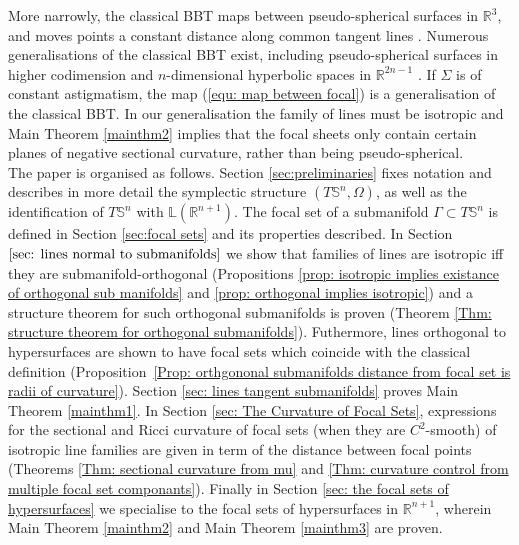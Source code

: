 \documentclass[12pt]{amsart}
\theoremstyle{plain}
\theoremstyle{definition}
\def\R{\mathbb{R}}
\def\S{\mathbb{S}}
\numberwithin{equation}{section}
\begin{document}
More narrowly, the classical BBT maps between pseudo-spherical surfaces in $\R^{3}$, and moves points a constant distance along common tangent lines \cite{RaS82}. Numerous generalisations of the classical BBT exist, including pseudo-spherical surfaces in higher codimension \cite{Gorkavvy2012}\cite{Gorkavvy2015} and $n$-dimensional hyperbolic spaces in ${\mathbb R}^{2n-1}$ \cite{Aminov1978} \cite{Aminov2011} \cite{TaT79} \cite{Terng1980}.
If $\Sigma$ is of constant astigmatism, the map (\ref{equ: map between focal}) is a generalisation of the classical BBT. In our generalisation the family of lines must be isotropic and Main Theorem \ref{mainthm2} implies that the focal sheets only contain certain planes of negative sectional curvature, rather than being pseudo-spherical.\\ 

The paper is organised as follows. Section \ref{sec:preliminaries} fixes notation and describes in more detail the symplectic structure $(T\S^n,\Omega)$, as well as the identification of $T\S^n$ with $\mathbb{L}(\R^{n+1})$. The focal set of a submanifold $\Gamma\subset T\S^n$ is defined in Section \ref{sec:focal sets} and its properties described. In Section $\ref{sec: lines normal to submanifolds}$ we show that families of lines are isotropic iff they are submanifold-orthogonal (Propositions \ref{prop: isotropic implies existance of orthogonal sub manifolds} and \ref{prop: orthogonal implies isotropic}) and a structure theorem for such orthogonal submanifolds is proven (Theorem \ref{Thm: structure theorem for orthogonal submanifolds}). Futhermore, lines orthogonal to hypersurfaces are shown to have focal sets which coincide with the classical definition (\mbox{Proposition \ref{Prop: orthgononal submanifolds distance from focal set is radii of curvature}}). Section \ref{sec: lines tangent submanifolds} proves Main Theorem \ref{mainthm1}. In Section \ref{sec: The Curvature of Focal Sets}, expressions for the sectional and Ricci curvature of focal sets (when they are $C^2$-smooth) of isotropic line families are given in term of the distance between focal points (Theorems \ref{Thm: sectional curvature from mu} and \ref{Thm: curvature control from multiple focal set componants}). Finally in Section \ref{sec: the focal sets of hypersurfaces} we specialise to the focal sets of hypersurfaces in $\R^{n+1}$, wherein Main Theorem \ref{mainthm2} and Main Theorem \ref{mainthm3} are proven.
\end{document}
